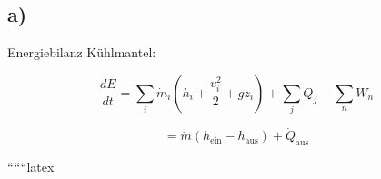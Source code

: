 

\subsection*{a)}

Energiebilanz Kühlmantel:

\[
\frac{dE}{dt} = \sum_i \dot{m}_i \left( h_i + \frac{v_i^2}{2} + g z_i \right) + \sum_j \dot{Q}_j - \sum_n \dot{W}_n
\]

\[
= \dot{m} (h_{\text{ein}} - h_{\text{aus}}) + \dot{Q}_{\text{aus}}
\]

``````latex